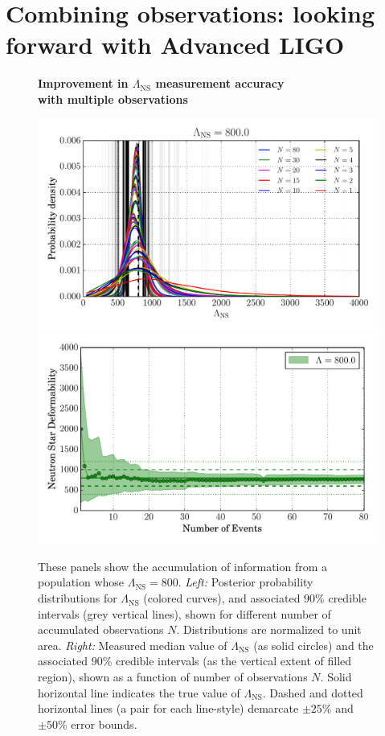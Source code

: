 \documentclass[aps,prd,amsmath,floats,floatfix, twocolumn,
superscriptaddress,nofootinbib,showpacs]{revtex4-1}
\newcommand{\lambdans}{\Lambda_\mathrm{NS}}
\begin{document}
\section{Combining observations: looking forward with Advanced LIGO}\label{s1:multiple_observations}
% 
\begin{figure}
\centering    
\textbf{Improvement in $\lambdans$ measurement accuracy\\ with multiple observations}\par\medskip
\includegraphics[width=0.8\columnwidth]{plots/pdfLambda_vs_N_L800.pdf}\\
\includegraphics[width=0.8\columnwidth]{plots/FillBetweenErrorBarsLambda_vs_N_L800.pdf}
\caption{%
These panels show the accumulation of information from a population whose
$\lambdans=800$.
{\it Left:} Posterior probability distributions for $\lambdans$ (colored 
curves), and associated $90\%$ credible intervals (grey vertical lines),
shown for different number of accumulated observations $N$. Distributions are
normalized to unit area.
{\it Right:} Measured median value of $\lambdans$ (as solid circles) and the 
associated $90\%$ credible intervals (as the vertical extent of filled
region), shown as a function of number of observations $N$. Solid horizontal
line indicates the true value of $\lambdans$. Dashed and dotted horizontal
lines (a pair for each line-style) demarcate $\pm 25\%$ and $\pm 50\%$ error
bounds.
}
\label{fig:TT_Lambda_vs_N_L800_CI90_0}
\end{figure}
\end{document}
